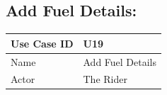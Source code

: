 \documentclass[12pt]{article}
\begin{document}
\subsection{Add Fuel Details:}

\begin{table}[H]
\begin{tabular}{|l|l|}
\hline
Use Case ID & U19                                                                                                                                                                                                                                                                                                                                                                                                                                                                                                                                                                                                                                                                              \\ \hline
Name        & Add Fuel Details                                                                                                                                                                                                                                                                                                                                                                                                                                                                                                                                                                                                                                                                 \\ \hline
Actor       & The Rider                                                                                                                                                                                                                                                                                                                                                                                                                                                                                                                                                                                                                                                                        \\ \hline

\end{tabular}
\end{table}
\end{document}

